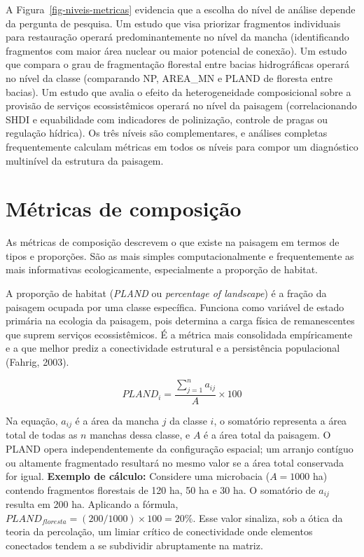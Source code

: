 \documentclass[
  portuguese,
  11pt,
  a4paper,
  open=any]{scrbook}
\begin{document}
A Figura~\ref{fig-niveis-metricas} evidencia que a escolha do nível de
análise depende da pergunta de pesquisa. Um estudo que visa priorizar
fragmentos individuais para restauração operará predominantemente no
nível da mancha (identificando fragmentos com maior área nuclear ou
maior potencial de conexão). Um estudo que compara o grau de
fragmentação florestal entre bacias hidrográficas operará no nível da
classe (comparando NP, AREA\_MN e PLAND de floresta entre bacias). Um
estudo que avalia o efeito da heterogeneidade composicional sobre a
provisão de serviços ecossistêmicos operará no nível da paisagem
(correlacionando SHDI e equabilidade com indicadores de polinização,
controle de pragas ou regulação hídrica). Os três níveis são
complementares, e análises completas frequentemente calculam métricas em
todos os níveis para compor um diagnóstico multinível da estrutura da
paisagem.

\section{Métricas de composição}\label{muxe9tricas-de-composiuxe7uxe3o}

As métricas de composição descrevem o que existe na paisagem em termos
de tipos e proporções. São as mais simples computacionalmente e
frequentemente as mais informativas ecologicamente, especialmente a
proporção de habitat.

A proporção de habitat (\emph{PLAND} ou \emph{percentage of landscape})
é a fração da paisagem ocupada por uma classe específica. Funciona como
variável de estado primária na ecologia da paisagem, pois determina a
carga física de remanescentes que suprem serviços ecossistêmicos. É a
métrica mais consolidada empíricamente e a que melhor prediz a
conectividade estrutural e a persistência populacional (Fahrig, 2003).

\[
PLAND_i = \frac{\sum_{j=1}^{n} a_{ij}}{A} \times 100
\]

Na equação, \(a_{ij}\) é a área da mancha \(j\) da classe \(i\), o
somatório representa a área total de todas as \(n\) manchas dessa
classe, e \(A\) é a área total da paisagem. O PLAND opera
independentemente da configuração espacial; um arranjo contíguo ou
altamente fragmentado resultará no mesmo valor se a área total
conservada for igual. \textbf{Exemplo de cálculo:} Considere uma
microbacia (\(A = 1000\) ha) contendo fragmentos florestais de 120 ha,
50 ha e 30 ha. O somatório de \(a_{ij}\) resulta em 200 ha. Aplicando a
fórmula, \(PLAND_{floresta} = (200 / 1000) \times 100 = 20\%\). Esse
valor sinaliza, sob a ótica da teoria da percolação, um limiar crítico
de conectividade onde elementos conectados tendem a se subdividir
abruptamente na matriz.
\end{document}
